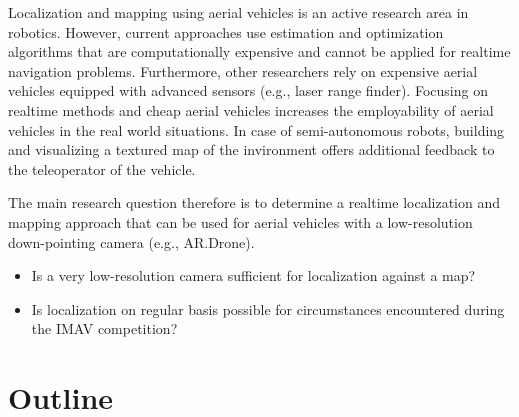 Localization and mapping using aerial vehicles is an active research area in robotics.
However, current approaches use estimation and optimization algorithms that are computationally expensive and cannot be applied for realtime navigation problems.
Furthermore, other researchers rely on expensive aerial vehicles equipped with advanced sensors (e.g., laser range finder).
Focusing on realtime methods and cheap aerial vehicles increases the employability of aerial vehicles in the real world situations.
In case of semi-autonomous robots, building and visualizing a textured map of the invironment offers additional feedback to the teleoperator of the vehicle.

The main research question therefore is to determine a realtime localization and mapping approach that can be used for aerial vehicles with a low-resolution down-pointing camera (e.g., AR.Drone).

\begin{itemize}
\item Is a very low-resolution camera sufficient for localization against a map?
\item Is localization on regular basis possible for circumstances encountered during the IMAV competition?
\end{itemize}


	\section{Outline}